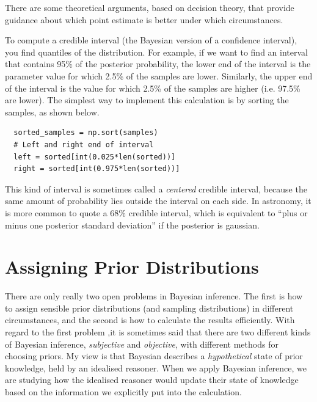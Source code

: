 There are some theoretical arguments, based on decision theory, that provide
guidance about which point estimate is better under which circumstances.

To compute a credible interval (the Bayesian version of a confidence interval),
you find quantiles of the distribution. For example, if we want to find an
interval that contains 95\% of the posterior probability, the lower end of the
interval is the parameter value for which 2.5\% of the samples are lower.
Similarly, the upper end of the interval is the value for which 2.5\% of the
samples are higher (i.e. 97.5\% are lower). The simplest way to implement this
calculation is by sorting the samples, as shown below.

\begin{verbatim}
  sorted_samples = np.sort(samples)
  # Left and right end of interval
  left = sorted[int(0.025*len(sorted))]
  right = sorted[int(0.975*len(sorted))]
\end{verbatim}

This kind of interval is sometimes called a {\it centered} credible interval,
because the same amount of probability lies outside the interval on each side.
In astronomy, it is more common to quote a 68\% credible interval, which is
equivalent to ``plus or minus one posterior standard deviation'' if the
posterior is gaussian.

\section{Assigning Prior Distributions}
There are only really two open problems in
Bayesian inference. The first is how to assign sensible prior distributions
(and sampling distributions) in different circumstances, and the
second is how to calculate the results efficiently. With regard to the first
problem ,it is sometimes said that there are two different kinds of Bayesian inference,
{\it subjective} and {\it objective}, with different methods for choosing
priors. My view is that Bayesian describes a {\it hypothetical}
state of prior knowledge, held by an idealised reasoner. When we apply
Bayesian inference, we are studying how the idealised reasoner would update
their state of knowledge based on the information we explicitly put into the
calculation.

